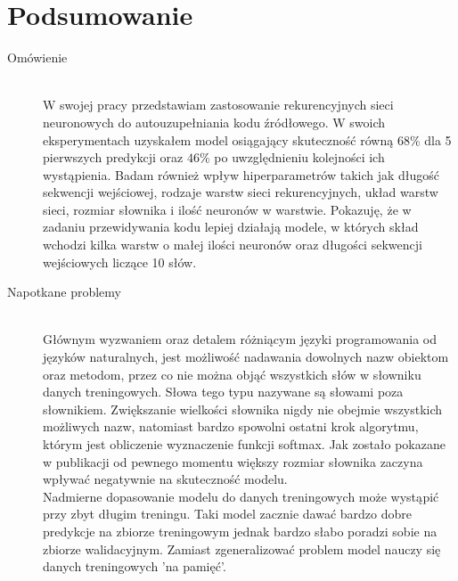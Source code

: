 \newpage %
 

\section{Podsumowanie}


  
  \begin{description}
    \item[Omówienie] 
    \hfill \\ W swojej pracy przedstawiam zastosowanie rekurencyjnych sieci neuronowych do autouzupełniania kodu źródłowego. W swoich 
    eksperymentach uzyskałem model osiągający skuteczność równą \begin{math}68\%\end{math} dla 5 pierwszych predykcji oraz 
    \begin{math}46\%\end{math} po uwzględnieniu kolejności ich wystąpienia. Badam również wpływ hiperparametrów takich jak 
    długość sekwencji wejściowej, rodzaje warstw sieci rekurencyjnych, układ warstw sieci, rozmiar słownika i
    ilość neuronów w warstwie. Pokazuję, że w zadaniu przewidywania kodu lepiej działają modele, w których skład wchodzi 
    kilka warstw o małej ilości neuronów oraz długości sekwencji wejściowych liczące 10 słów. \\

    \item[Napotkane problemy]
    \hfill\\
        \label{chellenges}
    Głównym wyzwaniem oraz detalem różniącym języki programowania od języków naturalnych, jest możliwość nadawania dowolnych
    nazw obiektom oraz metodom, przez co nie można objąć wszystkich słów w słowniku danych treningowych. Słowa tego typu 
    nazywane są słowami poza słownikiem. Zwiększanie wielkości słownika nigdy nie obejmie wszystkich możliwych nazw, natomiast 
    bardzo spowolni ostatni krok algorytmu, którym jest obliczenie wyznaczenie funkcji softmax. Jak zostało pokazane w publikacji 
    \cite{hellendoorn} od pewnego momentu większy rozmiar słownika zaczyna wpływać negatywnie na skuteczność modelu. \\


    Nadmierne dopasowanie modelu do danych treningowych może wystąpić przy zbyt długim treningu. Taki model 
    zacznie dawać bardzo dobre predykcje na zbiorze treningowym jednak bardzo słabo poradzi sobie na zbiorze 
    walidacyjnym. Zamiast zgeneralizować problem model nauczy się danych treningowych 'na pamięć'.\\



\end{description}
